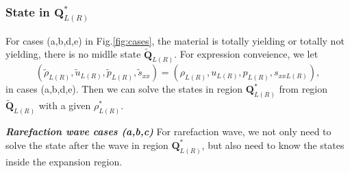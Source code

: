 \documentclass[review]{elsarticle}
\begin{document}
\begin{enumerate}[Step 1]
 \subsubsection{State in $\mathbf{Q}_{L(R)}^*$}

 For cases (a,b,d,e) in Fig.\ref{fig:cases}, the material is totally yielding or totally not yielding, there is no midlle state $\tilde{\mathbf{Q}}_{L(R)}$. For  expression conveience, we let    
 \begin{equation}
   (\tilde{\rho}_{L(R)},\tilde{u}_{L(R)},\tilde{p}_{L(R)},\tilde{s}_{xx}) =(\rho_{L(R)}, u_{L(R)},p_{L(R)},s_{xxL(R)}),
\end{equation}
in cases (a,b,d,e). Then we can solve the states in region $\mathbf{Q}_{L(R)}^*$ from region  $\tilde{\mathbf{Q}}_{L(R)}$ with a given $\rho^*_{L(R)}$.     

\emph{\textbf{Rarefaction wave cases (a,b,c)}} For rarefaction wave, 
we not only  need to solve the state after the wave in region $\mathbf{Q}_{L(R)}^*$, but also  need to know the states inside the expansion region. 


\end{enumerate}
\end{document}
